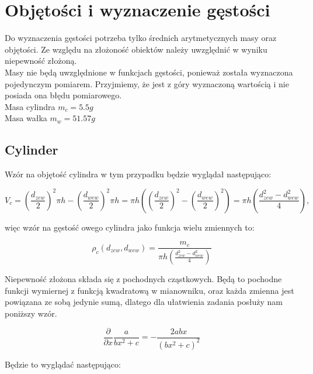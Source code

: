 \newpage

{\section{Objętości i wyznaczenie gęstości}}

Do wyznaczenia gęstości potrzeba tylko średnich arytmetycznych masy oraz objętości.
Ze względu na złożoność obiektów należy uwzględnić w wyniku niepewność złożoną. \\
\indent Masy nie będą uwzględnione w funkcjach gęstości, ponieważ została wyznaczona pojedynczym pomiarem.
Przyjmiemy, że jest z góry wyznaczoną wartością i nie posiada ona błędu pomiarowego.\\

{\indent \small Masa cylindra $m_c = 5.5g$} \\
{\indent \small Masa wałka $m_w = 51.57g$} \\

{\subsection{Cylinder}}

Wzór na objętość cylindra w tym przypadku będzie wyglądał następująco:

$$V_{c} = \left(\frac{d_{zew}}{2}\right)^2 \pi h - \left(\frac{d_{wew}}{2}\right)^2 \pi h = \pi h \left( \left(\frac{d_{zew}}{2}\right)^2 - \left(\frac{d_{wew}}{2}\right)^2 \right) = \pi h \left(\frac{d_{zew}^2 - d_{wew}^2}{4}\right)  \textrm{,}$$

więc wzór na gęstość owego cylindra jako funkcja wielu zmiennych to:

$$\displaystyle \rho_c(d_{zew}, d_{wew}) = \frac{m_c}{\pi h \left(\frac{d_{zew}^2 - d_{wew}^2}{4}\right)}$$

Niepewność złożona składa się z pochodnych cząstkowych.
Będą to pochodne funkcji wymiernej z funkcją kwadratową w mianowniku, oraz każda zmienna jest powiązana ze sobą jedynie sumą, dlatego dla ułatwienia zadania posłuży nam poniższy wzór.

$$\frac{\partial}{\partial x}\frac{a}{bx^2 + c} = -\frac{2abx}{(bx^2 + c)^2}$$

Będzie to wyglądać następująco:

